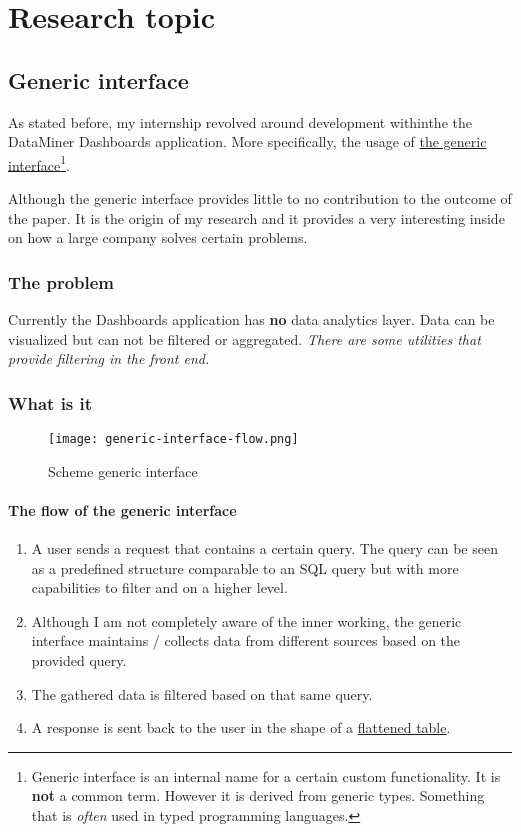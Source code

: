 \chapter{Research topic}

\section{Generic interface}
As stated before, my internship revolved around development withinthe the DataMiner Dashboards application. More specifically, the usage of \underline{the generic interface}\footnote{Generic interface is an internal name for a certain custom functionality. It is \textbf{not} a common term. However it is derived from generic types. Something that is \textit{often} used in typed programming languages. }.

Although the generic interface provides little to no contribution to the outcome of the paper. It is the origin of my research and it provides a very interesting inside on how a large company solves certain problems.

\subsection{The problem}
Currently the Dashboards application has \textbf{no} data analytics layer. Data can be visualized but can not be filtered or aggregated. \textit{There are some utilities that provide filtering in the front end.}



\subsection{What is it}\label{section-generic-interface}
 \begin{figure}[h]
        \centering
        \texttt{[image: generic-interface-flow.png]}
        \caption{Scheme generic interface}
        \label{fig:generic-interface-flow}
    \end{figure}
\subsubsection{The flow of the generic interface}
    \begin{enumerate}
        \item{A user sends a request that contains a certain query. The query can be seen as a predefined structure comparable to an SQL query but with more capabilities to filter and on a higher level.}
        \item{Although I am not completely aware of the inner working, the generic interface maintains / collects data from different sources based on the provided query.}
        \item{The gathered data is filtered based on that same query.}
        \item{A response is sent back to the user in the shape of a \underline{flattened table}.}
    \end{enumerate}  
   
